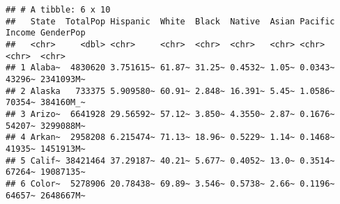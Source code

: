 \documentclass[
]{article}
\newenvironment{Shaded}{\begin{snugshade}}{\end{snugshade}}
\newcommand{\AttributeTok}[1]{\textcolor[rgb]{0.77,0.63,0.00}{#1}}
\newcommand{\FunctionTok}[1]{\textcolor[rgb]{0.00,0.00,0.00}{#1}}
\newcommand{\NormalTok}[1]{#1}
\newcommand{\OtherTok}[1]{\textcolor[rgb]{0.56,0.35,0.01}{#1}}
\newcommand{\SpecialCharTok}[1]{\textcolor[rgb]{0.00,0.00,0.00}{#1}}
\newcommand{\StringTok}[1]{\textcolor[rgb]{0.31,0.60,0.02}{#1}}
\begin{document}
\begin{Shaded}
\end{Shaded}

\begin{verbatim}
## # A tibble: 6 x 10
##   State  TotalPop Hispanic  White  Black  Native  Asian Pacific Income GenderPop
##   <chr>     <dbl> <chr>     <chr>  <chr>  <chr>   <chr> <chr>   <chr>  <chr>    
## 1 Alaba~  4830620 3.751615~ 61.87~ 31.25~ 0.4532~ 1.05~ 0.0343~ 43296~ 2341093M~
## 2 Alaska   733375 5.909580~ 60.91~ 2.848~ 16.391~ 5.45~ 1.0586~ 70354~ 384160M_~
## 3 Arizo~  6641928 29.56592~ 57.12~ 3.850~ 4.3550~ 2.87~ 0.1676~ 54207~ 3299088M~
## 4 Arkan~  2958208 6.215474~ 71.13~ 18.96~ 0.5229~ 1.14~ 0.1468~ 41935~ 1451913M~
## 5 Calif~ 38421464 37.29187~ 40.21~ 5.677~ 0.4052~ 13.0~ 0.3514~ 67264~ 19087135~
## 6 Color~  5278906 20.78438~ 69.89~ 3.546~ 0.5738~ 2.66~ 0.1196~ 64657~ 2648667M~
\end{verbatim}
\end{document}

